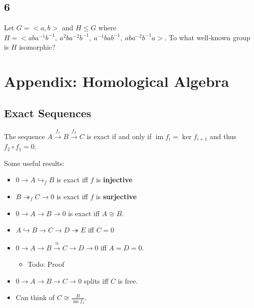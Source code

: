 \hypertarget{section-19}{%
\subsection{6}\label{section-19}}

Let \(G = <a, b>\) and \(H \leq G\) where
\(H = <aba^{-1}b^{-1},~ a^2ba^{-2}b^{-1},~ a^{-1}bab^{-1},~ aba^{-2}b^{-1}a>\).
To what well-known group is \(H\) isomorphic?

\hypertarget{appendix-homological-algebra}{%
\section{Appendix: Homological
Algebra}\label{appendix-homological-algebra}}

\hypertarget{exact-sequences}{%
\subsection{Exact Sequences}\label{exact-sequences}}

\begin{proposition}[?]

The sequence \(A \xrightarrow{f_1} B \xrightarrow{f_2} C\) is exact if
and only if \(\operatorname{im}f_i = \ker f_{i+1}\) and thus
\(f_2 \circ f_1 = 0\).

\end{proposition}

\begin{fact}

Some useful results:

\begin{itemize}
\tightlist
\item
  \(0 \to A \hookrightarrow_{f} B\) is exact iff \(f\) is
  \textbf{injective}
\item
  \(B\twoheadrightarrow_{f} C \to 0\) is exact iff \(f\) is
  \textbf{surjective}
\item
  \(0\to A \to B \to 0\) is exact iff \(A \cong B\).
\item
  \(A \hookrightarrow B \to C \to D \twoheadrightarrow E\) iff \(C = 0\)
\item
  \(0\to A \to B \xrightarrow{\cong} C \to D\to 0\) iff \(A = D = 0\).

  \begin{itemize}
  \tightlist
  \item
    Todo: Proof
  \end{itemize}
\item
  \(0\to A\to B \to C \to 0\) splits iff \(C\) is free.
\item
  Can think of \(C \cong \frac{B}{\operatorname{im}f_1}\).
\end{itemize}

\end{fact}

